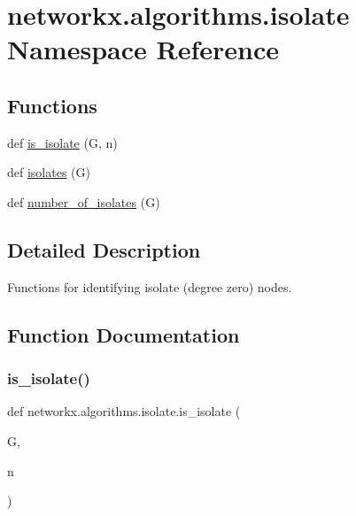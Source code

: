 \hypertarget{namespacenetworkx_1_1algorithms_1_1isolate}{}\section{networkx.\+algorithms.\+isolate Namespace Reference}
\label{namespacenetworkx_1_1algorithms_1_1isolate}
\subsection*{Functions}
\begin{DoxyCompactItemize}
\item 
def \hyperlink{namespacenetworkx_1_1algorithms_1_1isolate_a3a1a912d51cd51be02d2ae7481a8c18c}{is\+\_\+isolate} (G, n)
\item 
def \hyperlink{namespacenetworkx_1_1algorithms_1_1isolate_a74078653ae94897579962c208cf40e79}{isolates} (G)
\item 
def \hyperlink{namespacenetworkx_1_1algorithms_1_1isolate_a22ad14324f84b73111b34769d4e5466e}{number\+\_\+of\+\_\+isolates} (G)
\end{DoxyCompactItemize}


\subsection{Detailed Description}
\begin{DoxyVerb}Functions for identifying isolate (degree zero) nodes.
\end{DoxyVerb}
 

\subsection{Function Documentation}
\mbox{\label{namespacenetworkx_1_1algorithms_1_1isolate_a3a1a912d51cd51be02d2ae7481a8c18c}} 
\subsubsection{\texorpdfstring{is\+\_\+isolate()}{is\_isolate()}}
{\footnotesize\ttfamily def networkx.\+algorithms.\+isolate.\+is\+\_\+isolate (\begin{DoxyParamCaption}\item[{}]{G,  }\item[{}]{n }\end{DoxyParamCaption})}

